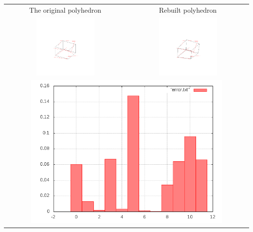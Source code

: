 \documentclass[11pt,fleqn,a4paper]{scrartcl}
\begin{document}
\begin{center}

\begin{tabular}{|c|c|}
\hline
The original polyhedron& Rebuilt polyhedron \\
\includegraphics[width=0.5\textwidth]{variant2/images/22/input.png} &
\includegraphics[width=0.5\textwidth]{variant2/images/22/out.png} \\
\midrule
\multicolumn{2}{|c|}{ \includegraphics[width=0.8\textwidth]{variant2/images/22/error.png}} \\
\hline
\end{tabular}
\end{center}
\end{document}
